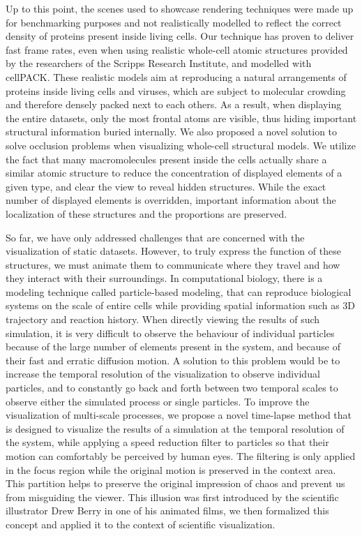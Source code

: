 Up to this point, the scenes used to showcase rendering techniques were made up for benchmarking purposes and not realistically modelled to reflect the correct density of proteins present inside living cells.
Our technique has proven to deliver fast frame rates, even when using realistic whole-cell atomic structures provided by the researchers of the Scripps Research Institute, and modelled with cellPACK.
These realistic models aim at reproducing a natural arrangements of proteins inside living cells and viruses, which are subject to molecular crowding and therefore densely packed next to each others.
As a result, when displaying the entire datasets, only the most frontal atoms are visible, thus hiding important structural information buried internally.
We also proposed a novel solution to solve occlusion problems when visualizing whole-cell structural models.
We utilize the fact that many macromolecules present inside the cells actually share a similar atomic structure to reduce the concentration of displayed elements of a given type, and clear the view to reveal hidden structures.
While the exact number of displayed elements is overridden, important information about the localization of these structures and the proportions are preserved.

So far, we have only addressed challenges that are concerned with the visualization of static datasets.
However, to truly express the function of these structures, we must animate them to communicate where they travel and how they interact with their surroundings.
In computational biology, there is a modeling technique called particle-based modeling, that can reproduce biological systems on the scale of entire cells while providing spatial information such as 3D trajectory and reaction history.
When directly viewing the results of such simulation, it is very difficult to observe the behaviour of individual particles because of the large number of elements present in the system, and because of their fast and erratic diffusion motion.
A solution to this problem would be to increase the temporal resolution of the visualization to observe individual particles, and to constantly go back and forth between two temporal scales to observe either the simulated process or single particles.
To improve the visualization of multi-scale processes, we propose a novel time-lapse method that is designed to visualize the results of a simulation at the temporal resolution of the system, while applying a speed reduction filter to particles so that their motion can comfortably be perceived by human eyes.
The filtering is only applied in the focus region while the original motion is preserved in the context area.
This partition helps to preserve the original impression of chaos and prevent us from misguiding the viewer.
This illusion was first introduced by the scientific illustrator Drew Berry in one of his animated films, we then formalized this concept and applied it to the context of scientific visualization.

